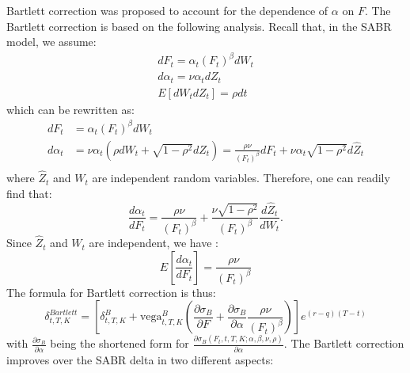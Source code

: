 \documentclass[letterpaper,12pt,titlepage,oneside,final]{book}
\numberwithin{equation}{section}
\theoremstyle{definition}
\begin{document}
Bartlett correction \cite{hagan2017bartlett,bartlett2006hedging} was proposed to account for the dependence of $\alpha$ on $F$.
The Bartlett correction is based on the following analysis. Recall that, in the SABR model, we assume:
\[
\begin{split}
dF_t=\alpha_t (F_t)^{\beta}dW_t\\
d\alpha_t=\nu \alpha_t dZ_t\\
E[dW_tdZ_t]=\rho dt
\end{split}
\]
which can be rewritten as:
\[
\begin{split}
dF_t&=\alpha_t (F_t)^{\beta}dW_t\\
d\alpha_t&=\nu \alpha_t \left(\rho dW_t +\sqrt{1-\rho^2} d\hat{Z}_t\right)=\frac{\rho \nu }{(F_t)^{\beta}}dF_t+\nu \alpha_t \sqrt{1-\rho^2} d\hat{Z}_t\\
\end{split}
\]
where  $\hat{Z}_t$ and $W_t$ are independent random variables.
Therefore, one can readily find that:
\[
	\frac{d\alpha_t}{dF_t}=\frac{\rho \nu }{(F_t)^{\beta}}+\frac{\nu \sqrt{1-\rho^2} }{(F_t)^{\beta}} \frac{d\hat{Z}_t}{dW_t}.
\]
Since $\hat{Z}_t$ and $W_t$ are independent, we have \cite{bartlett2006hedging}:
\[
   E\left[ \frac{d\alpha_t}{dF_t}\right] =\frac{\rho \nu }{(F_t)^{\beta}}
\]
The formula for Bartlett correction is thus:
\begin{equation}
\delta^{Bartlett}_{t,T,K}=\left[ 
    \delta^{B}_{t,T,K}+\text{vega}^{B}_{t,T,K} 
    \left(\frac{\partial \sigma_B}{\partial F}+ \frac{\partial \sigma_B}{\partial \alpha}\frac{\rho \nu }{(F_t)^{\beta}}\right)
\right]e^{(r-q) (T-t)}
\label{eq:bartlett}
\end{equation}
with $\frac{\partial \sigma_B}{\partial \alpha}$ being the shortened form for 
$\frac{\partial \sigma_B (F_t,t,T,K;\alpha,\beta,\nu,\rho)}{\partial \alpha}$.
The Bartlett correction improves over the SABR delta in two different aspects:
\end{document}
